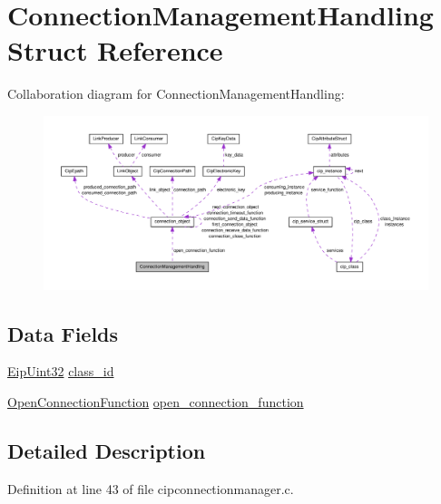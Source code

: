 \hypertarget{structConnectionManagementHandling}{\section{\-Connection\-Management\-Handling \-Struct \-Reference}
\label{d1/d46/structConnectionManagementHandling}
}


\-Collaboration diagram for \-Connection\-Management\-Handling\-:
\nopagebreak
\begin{figure}[H]
\begin{center}
\leavevmode
\includegraphics[width=350pt]{d4/dd2/structConnectionManagementHandling__coll__graph}
\end{center}
\end{figure}
\subsection*{\-Data \-Fields}
\begin{DoxyCompactItemize}
\item 
\hyperlink{typedefs_8h_abf2dd49262551294eb990ef8746a2767}{\-Eip\-Uint32} \hyperlink{structConnectionManagementHandling_ab1e9a99cb9ba1e520632e4429d9a290a}{class\-\_\-id}
\item 
\hyperlink{group__CIP__API_gaba609aaaca108b8d1b24da1ccbd7b375}{\-Open\-Connection\-Function} \hyperlink{structConnectionManagementHandling_a40ee7659db82868693852b3c569e8d41}{open\-\_\-connection\-\_\-function}
\end{DoxyCompactItemize}


\subsection{\-Detailed \-Description}


\-Definition at line 43 of file cipconnectionmanager.\-c.



